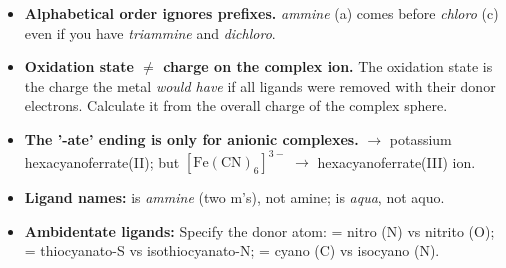 \documentclass[11pt]{article}
\begin{document}
\begin{attention}
\begin{itemize}
\item \textbf{Alphabetical order ignores prefixes.} \textit{ammine} (a) comes before \textit{chloro} (c) even if you have \textit{triammine} and \textit{dichloro}.
\item \textbf{Oxidation state $\neq$ charge on the complex ion.} The oxidation state is the charge the metal \emph{would have} if all ligands were removed with their donor electrons. Calculate it from the overall charge of the complex sphere.
\item \textbf{The '-ate' ending is only for anionic complexes.}  $\rightarrow$ potassium hexacyanoferrate(II); but \ensuremath{\mathrm{[Fe(CN)_{6}]^{3-}}} $\rightarrow$ hexacyanoferrate(III) ion.
\item \textbf{Ligand names:}  is \textit{ammine} (two m's), not amine;  is \textit{aqua}, not aquo.
\item \textbf{Ambidentate ligands:} Specify the donor atom:  = nitro (N) vs nitrito (O);  = thiocyanato-S vs isothiocyanato-N;  = cyano (C) vs isocyano (N).
\end{itemize}
\end{attention}
\end{document}
